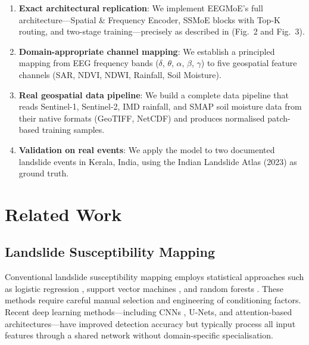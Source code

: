\documentclass[conference]{IEEEtran}
\begin{document}
\begin{enumerate}
    \item \textbf{Exact architectural replication}: We implement EEGMoE's full architecture—Spatial \& Frequency Encoder, SSMoE blocks with Top-K routing, and two-stage training—precisely as described in \cite{eegmoe2026} (Fig.~2 and Fig.~3).
    
    \item \textbf{Domain-appropriate channel mapping}: We establish a principled mapping from EEG frequency bands ($\delta$, $\theta$, $\alpha$, $\beta$, $\gamma$) to five geospatial feature channels (SAR, NDVI, NDWI, Rainfall, Soil Moisture).
    
    \item \textbf{Real geospatial data pipeline}: We build a complete data pipeline that reads Sentinel-1, Sentinel-2, IMD rainfall, and SMAP soil moisture data from their native formats (GeoTIFF, NetCDF) and produces normalised patch-based training samples.
    
    \item \textbf{Validation on real events}: We apply the model to two documented landslide events in Kerala, India, using the Indian Landslide Atlas (2023) as ground truth.
\end{enumerate}

\section{Related Work}

\subsection{Landslide Susceptibility Mapping}
Conventional landslide susceptibility mapping employs statistical approaches such as logistic regression \cite{logistic_landslide}, support vector machines \cite{svm_landslide}, and random forests \cite{rf_landslide}. These methods require careful manual selection and engineering of conditioning factors. Recent deep learning methods—including CNNs \cite{cnn_landslide}, U-Nets, and attention-based architectures—have improved detection accuracy but typically process all input features through a shared network without domain-specific specialisation.
\end{document}
